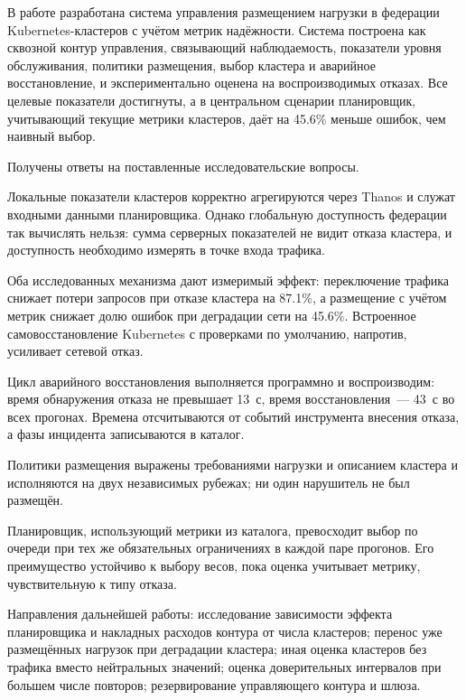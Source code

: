 

В работе разработана система управления размещением нагрузки в федерации
Kubernetes-кластеров с учётом метрик надёжности. Система построена как
сквозной контур управления, связывающий наблюдаемость, показатели уровня
обслуживания, политики размещения, выбор кластера и аварийное
восстановление, и экспериментально оценена на воспроизводимых отказах. Все
целевые показатели достигнуты, а в центральном сценарии планировщик,
учитывающий текущие метрики кластеров, даёт на 45.6\% меньше ошибок, чем
наивный выбор.

Получены ответы на поставленные исследовательские вопросы.

Локальные показатели кластеров корректно агрегируются через Thanos и служат
входными данными планировщика. Однако глобальную доступность федерации так
вычислять нельзя: сумма серверных показателей не видит отказа кластера, и
доступность необходимо измерять в точке входа трафика.

Оба исследованных механизма дают измеримый эффект: переключение трафика
снижает потери запросов при отказе кластера на 87.1\%, а размещение с учётом
метрик снижает долю ошибок при деградации сети на 45.6\%. Встроенное
самовосстановление Kubernetes с проверками по умолчанию, напротив, усиливает
сетевой отказ.

Цикл аварийного восстановления выполняется программно и воспроизводим: время
обнаружения отказа не превышает 13~с, время восстановления~--- 43~с во всех
прогонах. Времена отсчитываются от событий инструмента внесения отказа, а
фазы инцидента записываются в каталог.

Политики размещения выражены требованиями нагрузки и описанием кластера и
исполняются на двух независимых рубежах; ни один нарушитель не был размещён.

Планировщик, использующий метрики из каталога, превосходит выбор по очереди
при тех же обязательных ограничениях в каждой паре прогонов. Его
преимущество устойчиво к выбору весов, пока оценка учитывает метрику,
чувствительную к типу отказа.

Направления дальнейшей работы: исследование зависимости эффекта
планировщика и накладных расходов контура от числа кластеров; перенос уже
размещённых нагрузок при деградации кластера; иная оценка кластеров без
трафика вместо нейтральных значений; оценка доверительных интервалов при
большем числе повторов; резервирование управляющего контура и шлюза.
